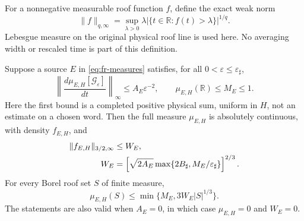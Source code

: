 For a nonnegative measurable roof function $f$, define the exact weak
norm
\begin{equation}\label{eq:fr-weak-norm}
 \|f\|_{q,\infty}
   =\sup_{\lambda>0}\lambda
       |\{t\in\mathbb R:f(t)>\lambda\}|^{1/q}.
\end{equation}
Lebesgue measure on the original physical roof line is used here.
No averaging width or rescaled time is part of this definition.

\begin{lemma}
\label{lem:fr-exhaustion}
Suppose a source $E$ in \eqref{eq:fr-measures} satisfies, for all
$0<\varepsilon\le\varepsilon_\sharp$,
\begin{equation}\label{eq:fr-premises}
 \left\|\frac{d\mu_{E,H}[\mathcal G_\varepsilon]}{dt}\right\|_\infty
       \le A_E\varepsilon^{-2},\qquad
 \mu_{E,H}(\mathbb R)\le M_E\le1.
\end{equation}
Here the first bound is a completed positive physical sum, uniform
in $H$, not an estimate on a chosen word.  Then the full measure
$\mu_{E,H}$ is absolutely continuous, with density $f_{E,H}$, and
\begin{align}\label{eq:fr-full-weak}
 \|f_{E,H}\|_{3/2,\infty}&\le W_E,\notag\\
 W_E&=\left[\sqrt{2A_E}
                 \max\{2B_\sharp,M_E/\varepsilon_\sharp\}\right]^{2/3}.
\end{align}
For every Borel roof set $S$ of finite measure,
\begin{equation}\label{eq:fr-all-borel}
 \mu_{E,H}(S)\le\min\{M_E,3W_E|S|^{1/3}\}.
\end{equation}
The statements are also valid when $A_E=0$, in which case
$\mu_{E,H}=0$ and $W_E=0$.
\end{lemma}
